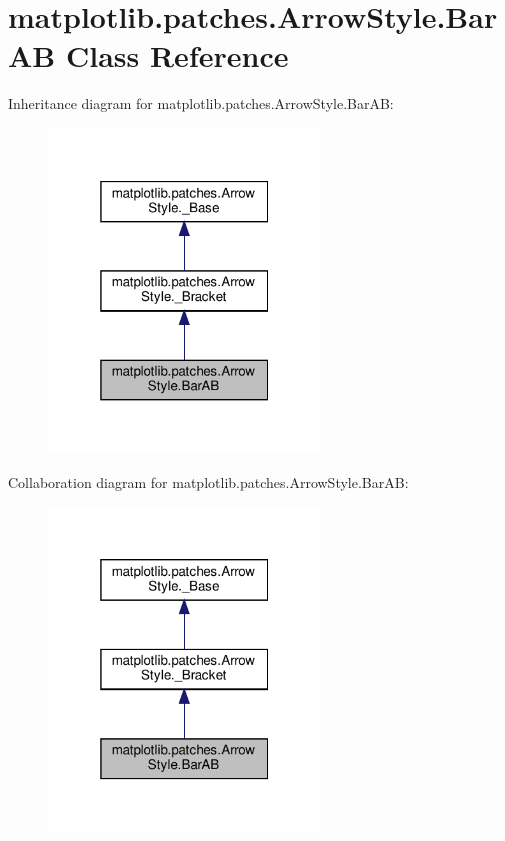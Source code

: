\hypertarget{classmatplotlib_1_1patches_1_1ArrowStyle_1_1BarAB}{}\section{matplotlib.\+patches.\+Arrow\+Style.\+Bar\+AB Class Reference}
\label{classmatplotlib_1_1patches_1_1ArrowStyle_1_1BarAB}


Inheritance diagram for matplotlib.\+patches.\+Arrow\+Style.\+Bar\+AB\+:
\nopagebreak
\begin{figure}[H]
\begin{center}
\leavevmode
\includegraphics[width=205pt]{classmatplotlib_1_1patches_1_1ArrowStyle_1_1BarAB__inherit__graph}
\end{center}
\end{figure}


Collaboration diagram for matplotlib.\+patches.\+Arrow\+Style.\+Bar\+AB\+:
\nopagebreak
\begin{figure}[H]
\begin{center}
\leavevmode
\includegraphics[width=205pt]{classmatplotlib_1_1patches_1_1ArrowStyle_1_1BarAB__coll__graph}
\end{center}
\end{figure}

